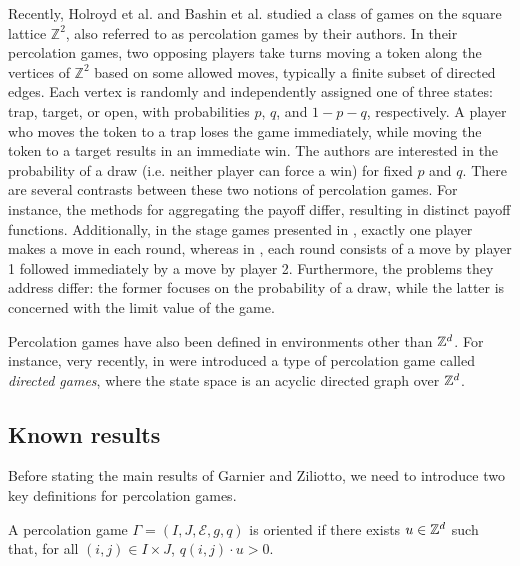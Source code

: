 	Recently, Holroyd et al. \cite{Holroyd18} and Bashin et al. \cite{Bashin23} studied a class of games on the square lattice $\mathbb{Z}^2$, also referred to as percolation games by their authors. In their percolation games, two opposing players take turns moving a token along the vertices of $\mathbb{Z}^2$ based on some allowed moves, typically a finite subset of directed edges. Each vertex  is randomly and independently assigned one of three states: trap, target, or open, with probabilities $p$, $q$, and $1-p-q$, respectively. A player who moves the token to a trap loses the game immediately, while moving the token to a target results in an immediate win. The authors are interested in the probability of a draw (i.e. neither player can force a win) for fixed $p$ and $q$. There are several contrasts between these two notions of percolation games. For instance, the methods for aggregating the payoff differ, resulting in distinct payoff functions. Additionally, in the stage games presented in \cite{Bashin23}, exactly one player makes a move in each round, whereas in \cite{GarnierZiliotto2022}, each round consists of a move by player 1 followed immediately by a move by player 2. Furthermore, the problems they address differ: the former focuses on the probability of a draw, while the latter is concerned with the limit value of the game.

	Percolation games have also been defined in environments other than $\mathbb{Z}^d$. For instance, very recently, in \cite{Attia2024} were introduced a type of percolation game called \emph{directed games}, where the state space is an acyclic directed graph over $\mathbb{Z}^d$. 


	\subsection{Known results}
	Before stating the main results of Garnier and Ziliotto, we need to introduce two key definitions for percolation games.

	\begin{definition}
		A percolation game $\Gamma = (I, J, \mathcal{E}, g, q)$ is oriented if there exists $u \in \mathbb{Z}^d$ such that, for all $(i, j) \in I \times J$, $q(i, j) \cdot u > 0$.
	\end{definition}

